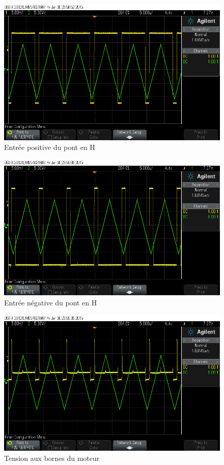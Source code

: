 \documentclass[a4paper]{article}
\begin{document}
\begin{figure}[H]
  \centering
    \includegraphics[width=1\textwidth]{scope_1}
  \caption{Entrée positive du pont en H}
\end{figure}

\begin{figure}[H]
  \centering
    \includegraphics[width=1\textwidth]{scope_2}
  \caption{Entrée négative du pont en H}
\end{figure}

\begin{figure}[H]
  \centering
    \includegraphics[width=1\textwidth]{scope_3}
  \caption{Tension aux bornes du moteur}
\end{figure}
\end{document}

